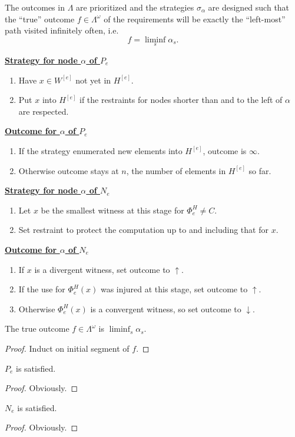 The outcomes in $\Lambda$ are prioritized and the strategies
$\sigma_\alpha$ are designed such that the ``true'' outcome
$f\in\Lambda^\omega$ of the requirements will be exactly the
``left-most'' path visited infinitely often, i.e.
\[f =\liminf_s \alpha_s.\]

\newpage
\underline{\textbf{Strategy for node $\alpha$ of $P_e$}}
\begin{enumerate}
  \item Have $x\in W^{[e]}$ not yet in $H^{[e]}$.
  \item Put $x$ into $H^{[e]}$ if the restraints for nodes shorter than and
    to the left of $\alpha$ are respected.
\end{enumerate}

\underline{\textbf{Outcome for $\alpha$ of $P_e$}}
\begin{enumerate}
  \item If the strategy enumerated new elements into $H^{[e]}$, outcome is
    $\infty$.
  \item Otherwise outcome stays at $n$, the number of elements in $H^{[e]}$
    so far.
\end{enumerate}

\underline{\textbf{Strategy for node $\alpha$ of $N_e$}}
\begin{enumerate}
  \item Let $x$ be the smallest witness at this stage for
    $\Phi_e^H \neq C$.
  \item Set restraint to protect the computation up to and including
    that for $x$.
\end{enumerate}

\underline{\textbf{Outcome for $\alpha$ of $N_e$}}
\begin{enumerate}
  \item If $x$ is a divergent witness, set outcome to $\uparrow$.
  \item If the use for $\Phi_e^H(x)$ was injured at this stage, set outcome
    to $\uparrow$.
  \item Otherwise $\Phi_e^H(x)$ is a convergent witness, so set outcome to
    $\downarrow$.
\end{enumerate}

\begin{lemma}
  The true outcome $f\in\Lambda^\omega$ is $\liminf_s \alpha_s$.
\end{lemma}

\begin{proof}
  Induct on initial segment of $f$.
\end{proof}

\begin{lemma}
  $P_e$ is satisfied.
\end{lemma}

\begin{proof}
  Obviously.
\end{proof}

\begin{lemma}
  $N_e$ is satisfied.
\end{lemma}

\begin{proof}
  Obviously.
\end{proof}
